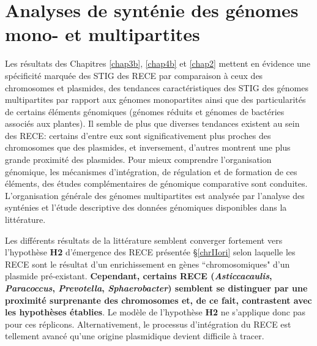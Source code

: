 \newpage
\chapter{Analyses de synténie des génomes mono- et multipartites}\label{chapsynt}

Les résultats des Chapitres \ref{chap3b}, \ref{chap4b} et \ref{chap2} mettent en évidence une spécificité marquée des STIG des RECE par comparaison à ceux des chromosomes et plasmides, des tendances caractéristiques des STIG des génomes multipartites par rapport aux génomes monopartites ainsi que des particularités de certains éléments génomiques (génomes réduits et génomes de bactéries associés aux plantes). Il semble de plus que diverses tendances existent au sein des RECE: certains d'entre eux sont significativement plus proches des chromosomes que des plasmides, et inversement, d'autres montrent une plus grande proximité des plasmides. Pour mieux comprendre l'organisation génomique, les mécanismes d'intégration, de régulation et de formation de ces éléments, des études complémentaires de génomique comparative sont conduites. L'organisation générale des génomes multipartites est analysée par l'analyse des synténies et l'étude descriptive des données génomiques disponibles dans la littérature.

Les différents résultats de la littérature semblent converger fortement vers l'hypothèse \textbf{H2} d'émergence des RECE présentée \S \ref{chrIIori} selon laquelle les RECE sont le résultat d'un enrichissement en gènes ``chromosomiques" d'un plasmide pré-existant. \textbf{\color{orange} Cependant, certains RECE (\textit{Asticcacaulis}, \textit{Paracoccus}, \textit{Prevotella}, \textit{Sphaerobacter}) semblent se distinguer par une proximité surprenante des chromosomes et, de ce fait, contrastent avec les hypothèses établies}. Le modèle de l'hypothèse \textbf{H2} ne s'applique donc pas pour ces réplicons. Alternativement, le processus d'intégration du RECE est tellement avancé qu'une origine plasmidique devient difficile à tracer.


